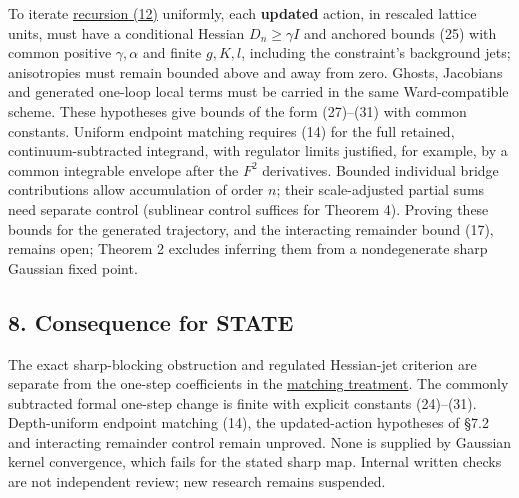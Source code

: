 \documentclass[11pt,a4paper]{article}
\begin{document}
To iterate \href{four-dimensional-parallel-log.md}{recursion (12)}
uniformly, each \textbf{updated} action, in rescaled lattice units, must
have a conditional Hessian \(D_n\ge\gamma I\) and anchored bounds (25)
with common positive \(\gamma,\alpha\) and finite \(g,K,l\), including
the constraint's background jets; anisotropies must remain bounded above
and away from zero. Ghosts, Jacobians and generated one-loop local terms
must be carried in the same Ward-compatible scheme. These hypotheses
give bounds of the form (27)--(31) with common constants. Uniform
endpoint matching requires (14) for the full retained,
continuum-subtracted integrand, with regulator limits justified, for
example, by a common integrable envelope after the \(F^2\) derivatives.
Bounded individual bridge contributions allow accumulation of order
\(n\); their scale-adjusted partial sums need separate control
(sublinear control suffices for Theorem 4). Proving these bounds for the
generated trajectory, and the interacting remainder bound (17), remains
open; Theorem 2 excludes inferring them from a nondegenerate sharp
Gaussian fixed point.

\hypertarget{consequence-for-state}{%
\subsection{8. Consequence for STATE}\label{consequence-for-state}}

The exact sharp-blocking obstruction and regulated Hessian-jet criterion
are separate from the one-step coefficients in the
\href{four-dimensional-parallel-log.md}{matching treatment}. The
commonly subtracted formal one-step change is finite with explicit
constants (24)--(31). Depth-uniform endpoint matching (14), the
updated-action hypotheses of §7.2 and interacting remainder control
remain unproved. None is supplied by Gaussian kernel convergence, which
fails for the stated sharp map. Internal written checks are not
independent review; new research remains suspended.
\end{document}
